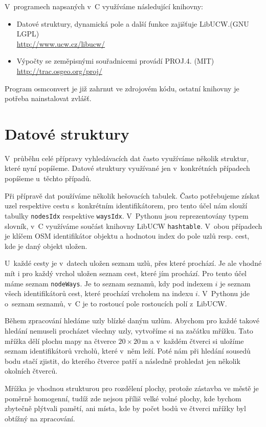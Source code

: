 \noindent V~programech napsaných v~C využíváme následující knihovny:
\begin{itemize}
	\item Datové struktury, dynamická pole a další funkce zajišťuje
	{\tuc LibUCW}.(GNU LGPL)\\
	\url{http://www.ucw.cz/libucw/}
	\item Výpočty se zeměpisnými souřadnicemi provádí {\tuc PROJ.4}. (MIT)\\
	\url{http://trac.osgeo.org/proj/}
\end{itemize}

Program osmconvert je již zahrnut ve zdrojovém kódu, ostatní knihovny je
potřeba nainstalovat zvlášť.

\section{Datové struktury}
V~průběhu celé přípravy vyhledávacích dat často využíváme několik struktur,
které nyní popíšeme. Datové struktury využívané jen v~konkrétních případech
popíšeme u~těchto případů.

Při přípravě dat používáme několik {\tuc hešovacích tabulek}. Často potřebujeme
získat uzel respektive cestu s~konkrétním identifikátorem, pro tento účel nám
slouží tabulky \verb|nodesIdx| respektive \verb|waysIdx|. V~Pythonu jsou
reprezentovány typem slovník, v~C využíváme součást knihovny LibUCW
\verb|hashtable|. V~obou případech je klíčem OSM identifikátor objektu a
hodnotou index do pole uzlů resp. cest, kde je daný objekt uložen.

U~každé cesty je v~datech uložen seznam uzlů, přes které prochází. Je ale vhodné
mít i pro každý vrchol uložen seznam cest, které jím prochází. Pro tento účel
máme seznam \verb|nodeWays|. Je to seznam seznamů, kdy pod indexem $i$ je seznam
všech identifikátorů cest, které prochází vrcholem na indexu $i$. V~Pythonu jde
o~seznam seznamů, v~C je to rostoucí pole rostoucích polí z~LibUCW.

Během zpracování hledáme uzly blízké daným uzlům. Abychom pro každé takové
hledání nemuseli procházet všechny uzly, vytvoříme si na začátku {\tuc mřížku}.
Tato mřížka dělí plochu mapy na čtverce $20 \times 20$\,m a v~každém čtverci si
uložíme seznam identifikátorů vrcholů, které v~něm leží. Poté nám při hledání
sousedů bodu stačí zjistit, do kterého čtverce patří a následně prohledat jen
několik okolních čtverců.

Mřížka je vhodnou strukturou pro rozdělení plochy, protože zástavba ve městě je
poměrně homogenní, tudíž zde nejsou příliš velké volné plochy, kde bychom
zbytečně plýtvali pamětí, ani místa, kde by počet bodů ve čtverci mřížky byl
obtížný na zpracování.

